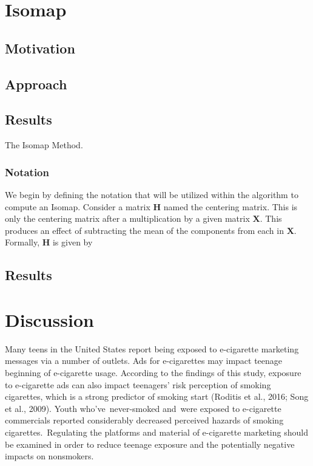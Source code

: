\documentclass[12pt]{article}
\begin{document}
\section{Isomap} \label{sec: Isomap}


\subsection{Motivation}

\subsection{Approach}

\subsection{Results}


\hspace{5mm}The Isomap Method.

\subsubsection{Notation}
\hspace{5mm}\text We begin by defining the notation that will be utilized within the algorithm to compute an Isomap. Consider a matrix $\textbf{H}$ named the centering matrix. This is only the centering matrix after a multiplication by a given matrix $\textbf{X}$. This produces an effect of subtracting the mean of the components from each in $\textbf{X}$. Formally, $\textbf{H}$ is given by 



\text{}

\subsection{Results}

\newpage

\section{Discussion} \label{sec:discussion}

\hspace{5mm}Many teens in the United States report being exposed to e-cigarette marketing messages via a number of outlets. Ads for e-cigarettes may impact teenage beginning of e-cigarette usage. According to the findings of this study, exposure to e-cigarette ads can also impact teenagers' risk perception of smoking cigarettes, which is a strong predictor of smoking start (Roditis et al., 2016; Song et al., 2009). Youth who've never-smoked and were exposed to e-cigarette commercials reported considerably decreased perceived hazards of smoking cigarettes. Regulating the platforms and material of e-cigarette marketing should be examined in order to reduce teenage exposure and the potentially negative impacts on nonsmokers. 
\end{document}
